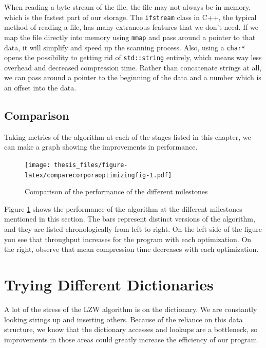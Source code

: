 \documentclass[12pt,twoside]{reedthesis}
\begin{document}
When reading a byte stream of the file, the file may not always be in memory, which is the fastest part of our storage. The \texttt{ifstream} class in C++, the typical method of reading a file, has many extraneous features that we don't need. If we map the file directly into memory using \texttt{mmap} and pass around a pointer to that data, it will simplify and speed up the scanning process. Also, using a \texttt{char*} opens the possibility to getting rid of \texttt{std::string} entirely, which means way less overhead and decreased compression time. Rather than concatenate strings at all, we can pass around a pointer to the beginning of the data and a number which is an offset into the data.

\hypertarget{comparison}{%
\subsection{Comparison}\label{comparison}}

Taking metrics of the algorithm at each of the stages listed in this chapter, we can make a graph showing the improvements in performance.
\begin{figure}
\centering
\texttt{[image: thesis\_files/figure-latex/comparecorporaoptimizingfig-1.pdf]}
\caption{\label{fig:comparecorporaoptimizingfig}Comparison of the performance of the different milestones}
\end{figure}
Figure \ref{fig:comparecorporaoptimizingfig} shows the performance of the algorithm at the different milestones mentioned in this section. The bars represent distinct versions of the algorithm, and they are listed chronologically from left to right. On the left side of the figure you see that throughput increases for the program with each optimization. On the right, observe that mean compression time decreases with each optimization.

\hypertarget{trying-different-dictionaries}{%
\section{Trying Different Dictionaries}\label{trying-different-dictionaries}}

A lot of the stress of the LZW algorithm is on the dictionary. We are constantly looking strings up and inserting others. Because of the reliance on this data structure, we know that the dictionary accesses and lookups are a bottleneck, so improvements in those areas could greatly increase the efficiency of our program.
\end{document}
